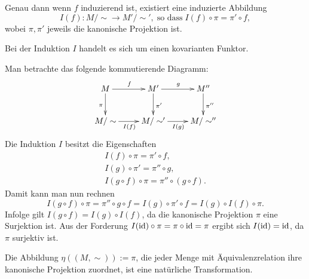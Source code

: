 Genau dann wenn $f$ induzierend ist, existiert eine induzierte
Abbildung
\begin{equation}
I(f)\colon M/\sim\to M'/\sim',\;\text{so dass}\;I(f)\circ\pi = \pi'\circ f,
\end{equation}
wobei $\pi,\pi'$ jeweils die kanonische Projektion ist.
\begin{Satz}
Bei der Induktion $I$ handelt es sich um einen kovarianten
Funktor.
\end{Satz}
 Man betrachte das folgende kommutierende Diagramm:
\[\xymatrix{
M \ar[r]^{f} \ar[d]_{\pi}
& M' \ar[r]^{g} \ar[d]^{\pi'}
& M'' \ar[d]^{\pi''}\\
M/\sim \ar[r]_{I(f)}
& M/\sim' \ar[r]_{I(g)}
& M/\sim''}\]
Die Induktion $I$ besitzt die Eigenschaften
\begin{gather}
I(f)\circ\pi = \pi'\circ f,\\
I(g)\circ\pi' = \pi''\circ g,\\
I(g\circ f)\circ\pi = \pi''\circ (g\circ f).
\end{gather}
Damit kann man nun rechnen
\begin{equation}
I(g\circ f)\circ\pi = \pi''\circ g\circ f
= I(g)\circ\pi'\circ f = I(g)\circ I(f)\circ\pi.
\end{equation}
Infolge gilt $I(g\circ f)=I(g)\circ I(f)$, da die kanonische
Projektion $\pi$ eine Surjektion ist. Aus der Forderung $I(\operatorname{id})\circ\pi
= \pi\circ\operatorname{id} = \pi$ ergibt sich $I(\operatorname{id}) = \operatorname{id}$,
da $\pi$ surjektiv ist.\;\qedsymbol

Die Abbildung $\eta((M,\sim)):=\pi$, die jeder Menge mit
Äquivalenzrelation ihre kanonische Projektion zuordnet,
ist eine natürliche Transformation.
